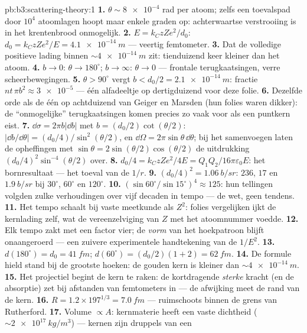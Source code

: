 \begin{solution}{pb:b3:scattering-theory:1}
\textbf{1.} $\theta \sim \num{8e-4}$ rad per atoom; zelfs een toevalspad
door $10^4$ atoomlagen hoopt maar enkele graden op: achterwaartse
verstrooiing is in het krentenbrood onmogelijk.
\textbf{2.} $E = k_CzZe^2/d_0$: $d_0 = k_CzZe^2/E =
\qty{4.1e-14}{m}$ --- veertig femtometer.
\textbf{3.} Dat de volledige positieve lading binnen $\sim\qty{4e-14}{m}$
zit: tienduizend keer kleiner dan het atoom.
\textbf{4.} $b \to 0$: $\theta \to 180^\circ$; $b \to \infty$: $\theta \to 0$ --- frontale terugkaatsingen, verre scheerbewegingen.
\textbf{5.} $\theta > 90^\circ$ vergt $b < d_0/2 =
\qty{2.1e-14}{m}$:
fractie $nt\,\pi b^2 \approx \num{3e-5}$ --- één alfadeeltje op dertigduizend
voor deze folie.
\textbf{6.} Dezelfde orde als de één op achtduizend van Geiger en Marsden
(hun folies waren dikker): de ``onmogelijke'' terugkaatsingen komen
precies zo vaak voor als een puntkern eist.
\textbf{7.} $\dd\sigma = 2\pi b|\dd b|$ met $b =
(d_0/2)\cot(\theta/2)$: $|\dd b/\dd\theta| = (d_0/4)/\sin^2(
\theta/2)$, en $\dd\Omega = 2\pi\sin\theta\,\dd\theta$; bij het
samenvoegen laten de opheffingen met $\sin\theta = 2\sin(\theta/2)\cos(\theta/2)$ de uitdrukking
$(d_0/4)^2\sin^{-4}(\theta/2)$ over.
\textbf{8.} $d_0/4 = k_CzZe^2/4E = Q_1Q_2/16\pi\varepsilon_0E$: het
bornresultaat --- het toeval van de $1/r$.
\textbf{9.} $(d_0/4)^2 = \qty{1.06}{b/sr}$: $236$, $17$ en
$\qty{1.9}{b/sr}$ bij $30^\circ$, $60^\circ$ en $120^\circ$.
\textbf{10.} $(\sin60^\circ/\sin15^\circ)^4 \approx 125$: hun tellingen
volgden zulke verhoudingen over vijf decaden in tempo --- de wet, geen
tendens.
\textbf{11.} Het tempo schaalt bij vaste meetkunde als $Z^2$: folies
vergelijken ijkt de kernlading zelf, wat de vereenzelviging van $Z$ met
het atoomnummer voedde.
\textbf{12.} Elk tempo zakt met een factor vier; de \emph{vorm} van het
hoekpatroon blijft onaangeroerd --- een zuivere experimentele handtekening
van de $1/E^2$.
\textbf{13.} $d(180^\circ) = d_0 = \qty{41}{fm}$; $d(60^\circ) =
(d_0/2)(1 + 2) = \qty{62}{fm}$.
\textbf{14.} De formule hield stand bij de grootste hoeken: de gouden kern
is kleiner dan $\sim\qty{4e-14}{m}$.
\textbf{15.} Het projectiel begint de kern te raken: de kortdragende
\emph{sterke} kracht (en de absorptie) zet bij afstanden van femtometers
in --- de afwijking meet de rand van de kern.
\textbf{16.} $R = 1.2 \times 197^{1/3} = \qty{7.0}{fm}$ --- ruimschoots
binnen de grens van Rutherford.
\textbf{17.} Volume $\propto A$: kernmaterie heeft een vaste dichtheid
($\sim\qty{2e17}{kg/m^3}$) --- kernen zijn druppels van een

\end{solution}
